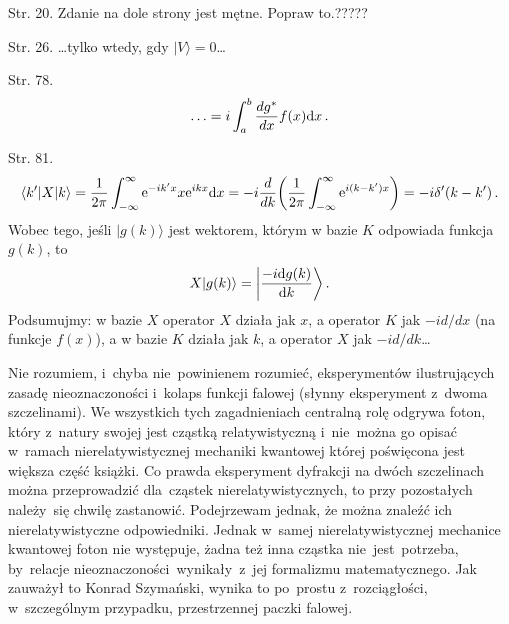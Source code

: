 \documentclass[a4paper,11pt]{article}
\begin{document}
\noindent
Str. 20. Zdanie na dole strony jest mętne. Popraw to.?????

Str. 26. \ldots tylko wtedy, gdy $| V \rangle = 0$\ldots

Str. 78. %
$$\ldots = i \int_{a}^{b} \frac{ dg^{ * } }{ dx } f( x ) \mathrm{d} x \, .$$

Str. 81.
  $$\langle k' | X | k \rangle = \frac{ 1 }{ 2 \pi } \int_{ -\infty
  }^{ \infty } \mathrm{e}^{ -i k' x } x \mathrm{e}^{ i k x } \mathrm{d} x = -i \frac{ d }{ dk } \bigg( \frac{ 1 }{ 2 \pi } \int_{ -\infty }^{ \infty } \mathrm{e}^{ i ( k - k' ) x } \bigg) = -i \delta'( k - k' ) \, .$$ Wobec
  tego, jeśli $| g( k ) \rangle$ jest wektorem, którym w bazie $K$
  odpowiada funkcja $g( k )$, to
$$X| g( k ) \rangle = \bigg| \frac{ -i \mathrm{d} g( k ) }{ \mathrm{d} k } \bigg\rangle \, .$$
Podsumujmy: w bazie $X$ operator $X$ działa jak $x$, a operator $K$
jak $-i d / d x$ (na funkcje $f( x )$), a w bazie $K$ działa jak
$k$, a operator $X$ jak $-i d / d k$\ldots


\vspace{\spaceTwo}














\noindent
Nie rozumiem, i~chyba nie~powinienem rozumieć, eksperymentów
ilustrujących zasadę nieoznaczoności i~kolaps funkcji falowej
(słynny eksperyment z~dwoma szczelinami). We wszystkich tych
zagadnieniach centralną rolę odgrywa foton, który z~natury swojej
jest cząstką relatywistyczną i~nie~można go opisać w~ramach
nierelatywistycznej mechaniki kwantowej której poświęcona jest
większa część książki. Co prawda eksperyment dyfrakcji na dwóch
szczelinach można przeprowadzić dla~cząstek nierelatywistycznych, to
przy pozostałych należy~się chwilę zastanowić. Podejrzewam jednak,
że można znaleźć ich nierelatywistyczne odpowiedniki. Jednak w~samej
nierelatywistycznej mechanice kwantowej foton nie występuje, żadna
też inna cząstka nie~jest~potrzeba, by~relacje
nieoznaczoności~wynikały~z~jej formalizmu matematycznego. Jak
zauważył to Konrad Szymański, wynika to po~prostu z~rozciągłości,
w~szczególnym przypadku, przestrzennej paczki falowej.

\vspace{\spaceFour}
\end{document}
